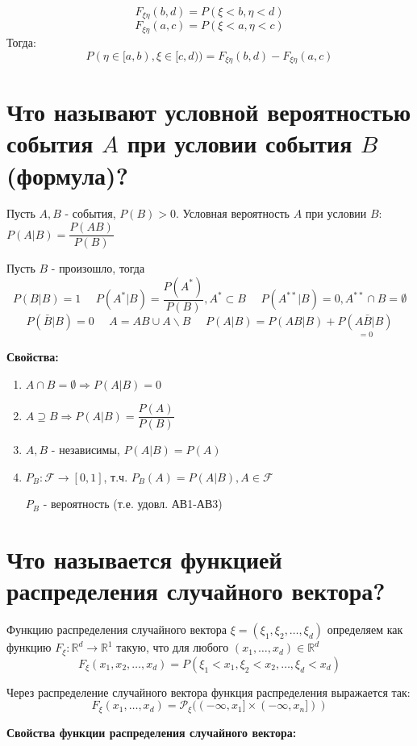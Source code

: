\[F_{\xi\eta}(b, d) = P(\xi < b, \eta < d)\]
\[F_{\xi\eta}(a, c) = P(\xi < a, \eta < c)\]
Тогда:
\[P(\eta \in [a,b), \xi \in [c,d)) = F_{\xi\eta}(b, d) - F_{\xi\eta}(a, c)\]

\section{Что называют условной вероятностью события $A$ при условии события $B$ (формула)?}

Пусть $A, B$ - события, $P(B) > 0$. Условная вероятность $A$ при условии $B$: $P(A | B) = \dfrac{P(AB)}{P(B)}$

\begin{remark}
	Пусть $B$ - произошло, тогда
	\[ P(B|B) = 1 ~~~~~~ P(A^*|B) = \frac{P(A^*)}{P(B)}, A^* \subset B ~~~~~~ P(A^{**} | B) = 0, A^{**} \cap B = \emptyset \]
	\[ P(\bar B | B) = 0 ~~~~~~ A = AB \cup A \backslash B ~~~~~~ P(A|B) = P(AB | B) + \underset{=0}{P(A \bar B | B)} \]
\end{remark}

\textbf{Свойства:}
\begin{enumerate}
	\item $A \cap B = \emptyset \Rightarrow P(A|B) = 0$
	\item $A \supseteq B \Rightarrow P(A|B) = \dfrac{P(A)}{P(B)}$
	\item $A, B$ - независимы, $P(A|B) = P(A)$
	\item $P_B: \mathcal{F} \to [0,1]$, т.ч. $P_B (A) = P(A|B), A \in \mathcal{F}$
	
	$P_B$ - вероятность (т.е. удовл. АВ1-АВ3)
\end{enumerate}

\section{Что называется функцией распределения случайного вектора?}

Функцию распределения случайного вектора $\xi = (\xi_1, \xi_2, \dots, \xi_d)$ определяем как функцию $F_{\xi}: \mathbb{R}^d \to \mathbb{R}^1$ такую, что для любого $(x_1, \dots, x_d) \in \mathbb{R}^d$
\[ F_{\xi} (x_1, x_2, \dots, x_d) = P(\xi_1 < x_1, \xi_2 < x_2, \dots, \xi_d < x_d) \]

\noindent Через распределение случайного вектора функция распределения выражается так:
\[F_\xi(x_1,\dots,x_d) = \mathcal{P}_\xi((-\infty,x_1]\times(-\infty, x_n]))\]

\textbf{Свойства функции распределения случайного вектора:}

